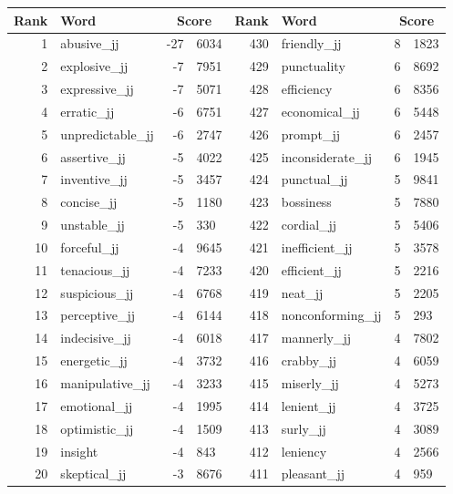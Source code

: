 \begin{table}[tbp]
    \begin{tabular}{| rlr@{.}l | rlr@{.}l |}
    \hline
    \textbf{Rank} & \textbf{Word} & \multicolumn{2}{c|}{\textbf{Score}} & \textbf{Rank} & \textbf{Word} & \multicolumn{2}{c|}{\textbf{Score}} \\
    \hline
    1 & abusive\_jj & -27 & 6034    &    430 & friendly\_jj & 8 & 1823 \\
    2 & explosive\_jj & -7 & 7951    &    429 & punctuality & 6 & 8692 \\
    3 & expressive\_jj & -7 & 5071    &    428 & efficiency & 6 & 8356 \\
    4 & erratic\_jj & -6 & 6751    &    427 & economical\_jj & 6 & 5448 \\
    5 & unpredictable\_jj & -6 & 2747    &    426 & prompt\_jj & 6 & 2457 \\
    6 & assertive\_jj & -5 & 4022    &    425 & inconsiderate\_jj & 6 & 1945 \\
    7 & inventive\_jj & -5 & 3457    &    424 & punctual\_jj & 5 & 9841 \\
    8 & concise\_jj & -5 & 1180    &    423 & bossiness & 5 & 7880 \\
    9 & unstable\_jj & -5 & 330    &    422 & cordial\_jj & 5 & 5406 \\
    10 & forceful\_jj & -4 & 9645    &    421 & inefficient\_jj & 5 & 3578 \\
    11 & tenacious\_jj & -4 & 7233    &    420 & efficient\_jj & 5 & 2216 \\
    12 & suspicious\_jj & -4 & 6768    &    419 & neat\_jj & 5 & 2205 \\
    13 & perceptive\_jj & -4 & 6144    &    418 & nonconforming\_jj & 5 & 293 \\
    14 & indecisive\_jj & -4 & 6018    &    417 & mannerly\_jj & 4 & 7802 \\
    15 & energetic\_jj & -4 & 3732    &    416 & crabby\_jj & 4 & 6059 \\
    16 & manipulative\_jj & -4 & 3233    &    415 & miserly\_jj & 4 & 5273 \\
    17 & emotional\_jj & -4 & 1995    &    414 & lenient\_jj & 4 & 3725 \\
    18 & optimistic\_jj & -4 & 1509    &    413 & surly\_jj & 4 & 3089 \\
    19 & insight & -4 & 843    &    412 & leniency & 4 & 2566 \\
    20 & skeptical\_jj & -3 & 8676    &    411 & pleasant\_jj & 4 & 959 \\

\end{tabular}
\end{table}
